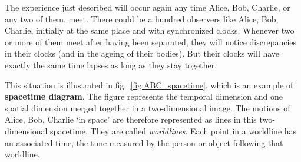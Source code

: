 \documentclass[a4paper,12pt,%
onecolumn,oneside,%
british%
]{memoir}
\renewcommand*{\|}[1][]{\nonscript\:#1\vert\nonscript\:\mathopen{}}
\newcommand*{\fig}{fig.}%
\begin{document}
The experience just described will occur again any time Alice, Bob, Charlie, or any two of them, meet. There could be a hundred observers like Alice, Bob, Charlie, initially at the same place and with synchronized clocks. Whenever two or more of them meet after having been separated, they will notice discrepancies in their clocks (and in the ageing of their bodies). But their clocks will have exactly the same time lapses as long as they stay together.

%
%
This situation is illustrated in \fig~\ref{fig:ABC_spacetime}, which is an example of \textbf{spacetime diagram}. The figure represents the temporal dimension and one spatial dimension merged together in a two-dimensional image. The motions of Alice, Bob, Charlie \enquote*{in space} are therefore represented as lines in this two-dimensional spacetime. They are called \emph{worldlines}. Each point in a worldline has an associated time, the time measured by the person or object following that worldline.
\end{document}
